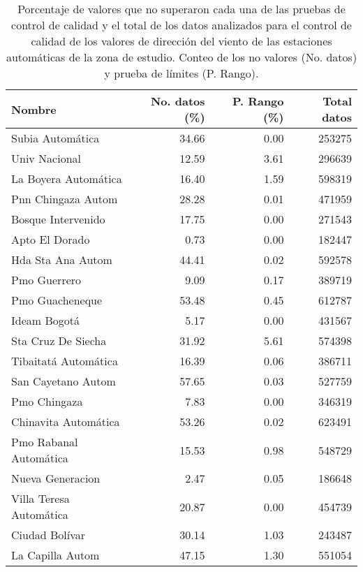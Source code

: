 \begin{table}[H]
\begin{center}

\caption{Porcentaje de valores que no superaron cada una de las pruebas de control de calidad y el total de los datos analizados para el control de calidad de los valores de dirección del viento de las estaciones automáticas de la zona de estudio. Conteo de los no valores (No. datos) y prueba de límites (P. Rango).}

\begin{tabular}{lrrr}
\toprule
      Nombre &  No. datos  (\%)&  P. Rango  (\%)& Total datos \\
\midrule
         Subia Automática &      34.66 &      0.00 &        253275 \\
           Univ Nacional &      12.59 &      3.61 &        296639 \\
    La Boyera Automática &      16.40 &      1.59 &        598319 \\
      Pnn Chingaza Autom &      28.28 &      0.01 &        471959 \\
      Bosque Intervenido &      17.75 &      0.00 &        271543 \\
          Apto El Dorado &       0.73 &      0.00 &        182447 \\
       Hda Sta Ana Autom &      44.41 &      0.02 &        592578 \\
            Pmo Guerrero &       9.09 &      0.17 &        389719 \\
         Pmo Guacheneque &      53.48 &      0.45 &        612787 \\
            Ideam Bogotá &       5.17 &      0.00 &        431567 \\
      Sta Cruz De Siecha &      31.92 &      5.61 &        574398 \\
    Tibaitatá Automática &      16.39 &      0.06 &        386711 \\
      San Cayetano Autom &      57.65 &      0.03 &        527759 \\
            Pmo Chingaza &       7.83 &      0.00 &        346319 \\
    Chinavita Automática &      53.26 &      0.02 &        623491 \\
  Pmo Rabanal Automática &      15.53 &      0.98 &        548729 \\
        Nueva Generacion &       2.47 &      0.05 &        186648 \\
 Villa Teresa Automática &      20.87 &      0.00 &        454739 \\
          Ciudad Bolívar &      30.14 &      1.03 &        243487 \\
        La Capilla Autom &      47.15 &      1.30 &        551054 \\
\bottomrule
\end{tabular}
		\label{tabla:val_vel_viento}
\end{center}
\end{table}

